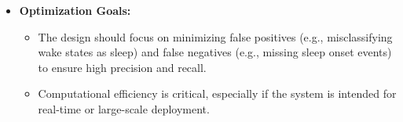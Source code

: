 \documentclass[conference]{IEEEtran}
\begin{document}
\begin{itemize}
    \item \textbf{Optimization Goals:}
    \begin{itemize}
        \item The design should focus on minimizing false positives (e.g., misclassifying wake states as sleep) and false negatives (e.g., missing sleep onset events) to ensure high precision and recall.
        \item Computational efficiency is critical, especially if the system is intended for real-time or large-scale deployment.
    \end{itemize}
\end{itemize}
\end{document}
